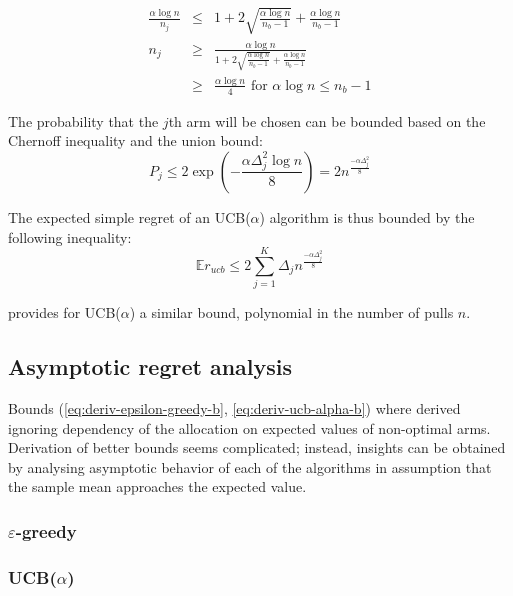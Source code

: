 \documentclass{article}
\newcommand {\IE} {\ensuremath {\mathbb{E}}}
\begin{document}
\begin{eqnarray}
\frac {\alpha \log n} {n_j}&\le& 1 + 2  \sqrt {\frac {\alpha \log n}
  {n_b-1}} + \frac {\alpha \log n} {n_b-1}\nonumber\\
n_j &\ge& \frac {\alpha \log n} {1+2 \sqrt {\frac {\alpha \log n}
    {n_b-1}} + \frac {\alpha \log n} {n_b-1}}\nonumber\\
    &\ge& \frac {\alpha \log n} {4} \mbox{ for } \alpha \log n \le n_b-1
\end{eqnarray}

The probability that the $j$th arm will be chosen can be bounded based
on the Chernoff inequality and the union bound:
\begin{equation}
P_j \le 2 \exp\left(-\frac {\alpha \Delta_j^2 \log n} 8 \right) = 2n^{\frac {-\alpha \Delta_j^2} 8}
\end{equation}

The expected simple regret of an UCB($\alpha$) algorithm is thus
bounded by the following inequality:
\begin{equation}
\IE r_{ucb} \le 2\sum_{j=1}^K \Delta_jn^{\frac {-\alpha \Delta_j^2} 8}
\label{eq:deriv-ucb-alpha-b}
\end{equation}

\cite{Bubeck.pure} provides for UCB($\alpha$) a similar bound,
polynomial in the number of pulls $n$.

\subsection{Asymptotic regret analysis}

Bounds (\ref{eq:deriv-epsilon-greedy-b}, \ref{eq:deriv-ucb-alpha-b}) where
derived ignoring dependency of the allocation on expected values
of non-optimal arms. Derivation of better bounds seems complicated; instead, insights
can be obtained by analysing  asymptotic behavior of each of the
algorithms in assumption that the sample mean approaches the expected
value. 

\subsubsection{$\varepsilon$-greedy}

\subsubsection{UCB($\alpha$)}
\end{document}
